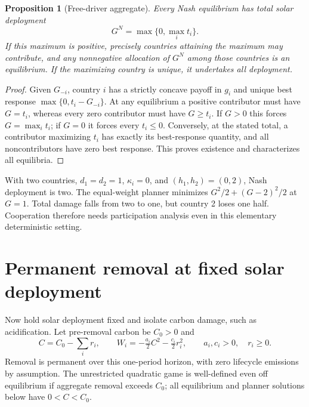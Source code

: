 \documentclass[11pt]{article}
\newtheorem{proposition}{Proposition}
\theoremstyle{definition}
\begin{document}
\begin{proposition}[Free-driver aggregate]
Every Nash equilibrium has total solar deployment
\[
 G^N=\max\{0,\max_i t_i\}.
\]
If this maximum is positive, precisely countries attaining the maximum may contribute, and any nonnegative allocation of $G^N$ among those countries is an equilibrium. If the maximizing country is unique, it undertakes all deployment.
\end{proposition}
\begin{proof}
Given $G_{-i}$, country $i$ has a strictly concave payoff in $g_i$ and unique best response $\max\{0,t_i-G_{-i}\}$. At any equilibrium a positive contributor must have $G=t_i$, whereas every zero contributor must have $G\geq t_i$. If $G>0$ this forces $G=\max_i t_i$; if $G=0$ it forces every $t_i\leq0$. Conversely, at the stated total, a contributor maximizing $t_i$ has exactly its best-response quantity, and all noncontributors have zero best response. This proves existence and characterizes all equilibria.
\end{proof}
With two countries, $d_1=d_2=1$, $\kappa_i=0$, and $(h_1,h_2)=(0,2)$, Nash deployment is two. The equal-weight planner minimizes $G^2/2+(G-2)^2/2$ at $G=1$. Total damage falls from two to one, but country 2 loses one half. Cooperation therefore needs participation analysis even in this elementary deterministic setting.

\section*{Permanent removal at fixed solar deployment}
Now hold solar deployment fixed and isolate carbon damage, such as acidification. Let pre-removal carbon be $C_0>0$ and
\[
 C=C_0-\sum_i r_i,\qquad
 W_i=-\tfrac{a_i}{2}C^2-\tfrac{c_i}{2}r_i^2,
 \qquad a_i,c_i>0,\quad r_i\geq0.
\]
Removal is permanent over this one-period horizon, with zero lifecycle emissions by assumption. The unrestricted quadratic game is well-defined even off equilibrium if aggregate removal exceeds $C_0$; all equilibrium and planner solutions below have $0<C<C_0$.
\end{document}
